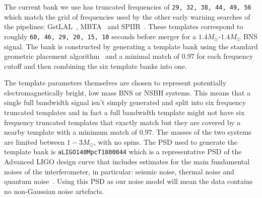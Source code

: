 The current bank we use has truncated frequencies of \verb|29, 32, 38, 44, 49, 56| which match the grid of frequencies used by the other early warning searches of the pipelines: GstLAL~\cite{GstLAL:2020}, MBTA~\cite{MBTA:2021} and SPIIR~\cite{SPIIR:2020}. These templates correspond to roughly \verb|60, 46, 29, 20, 15, 10| seconds before merger for a $1.4M_\odot$-$1.4M_\odot$ BNS signal. The bank is constructed by generating a template bank using the standard geometric placement algorithm~\cite{Brown:2012} and a minimal match of $0.97$ for each frequency cutoff and then combining the six template banks into one.

The template parameters themselves are chosen to represent potentially electromagnetically bright, low mass BNS or NSBH systems. This means that a single full bandwidth signal isn't simply generated and split into six frequency truncated templates and in fact a full bandwidth template might not have six frequency truncated templates that exactly match but they are covered by a nearby template with a minimum match of $0.97$. The masses of the two systems are limited between $1-3 M_\odot$, with no spins. The PSD used to generate the template bank is \verb|aLIGO140MpcT1800044| which is a representative PSD of the Advanced LIGO design curve that includes estimates for the main fundamental noises of the interferometer, in particular: seismic noise, thermal noise and quantum noise~\cite{aLIGO_design_curve:2018}. Using this PSD as our noise model will mean the data contains no non-Gaussian noise artefacts.

